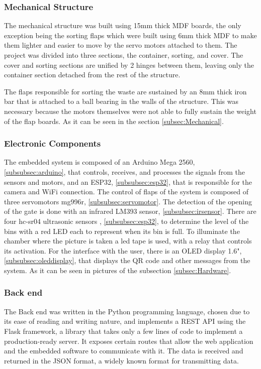 \documentclass[a4paper,11pt]{article}
\begin{document}
\subsubsection{Mechanical Structure}
The mechanical structure was built using 15mm thick MDF boards, the only exception being the sorting flaps which were built using 6mm thick MDF to make them lighter and easier to move by the servo motors attached to them. The project was divided into three sections, the container, sorting, and cover. The cover and sorting sections are unified by 2 hinges between them, leaving only the container section detached from the rest of the structure.

The flaps responsible for sorting the waste are sustained by an 8mm thick iron bar that is attached to a ball bearing in the walls of the structure. This was necessary because the motors themselves were not able to fully sustain the weight of the flap boards. As it can be seen in the section \ref{subsec:Mechanical}.

\subsubsection{Electronic Components}
The embedded system is composed of an Arduino Mega 2560, \ref{subsubsec:arduino}, that controls, receives, and processes the signals from the sensors and motors, and an ESP32, \ref{subsubsec:esp32}, that is responsible for the camera and WiFi connection.
The control of flaps of the system is composed of three servomotors mg996r, \ref{subsubsec:servomotor}. The detection of the opening of the gate is done with an infrared LM393 sensor, \ref{subsubsec:irsensor}. There are four hc-sr04 ultrasonic sensors , \ref{subsubsec:esp32}, to determine the level of the bins with a red LED each to represent when its bin is full. To illuminate the chamber where the picture is taken a led tape is used, with a relay that controls its activation. For the interface with the user, there is an OLED display 1.6", \ref{subsubsec:oleddisplay}, that displays the QR code and other messages from the system. As it can be seen in pictures of the subsection \ref{subsec:Hardware}.

\subsubsection{Back end}
The Back end was written in the Python\cite{python}  programming language, chosen due to its ease of reading and writing nature, and implements a REST API using the Flask\cite{flask} framework, a library that takes only a few lines of code to implement a production-ready server. It exposes certain routes that allow the web application and the embedded software to communicate with it. The data is received and returned in the JSON format, a widely known format for transmitting data.
\end{document}
